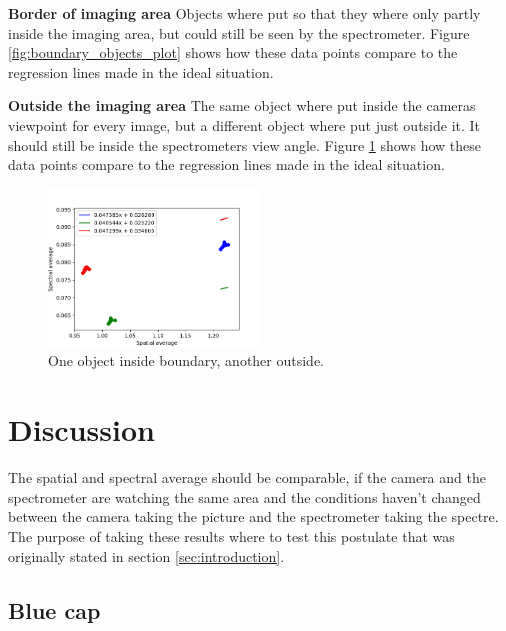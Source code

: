 \textbf{Border of imaging area}
Objects where put so that they where only partly inside the imaging area, but could still be seen by the spectrometer. Figure \ref{fig:boundary_objects_plot} shows how these data points compare to the regression lines made in the ideal situation.

\textbf{Outside the imaging area}
The same object where put inside the cameras viewpoint for every image, but a different object where put just outside it. It should still be inside the spectrometers view angle. Figure \ref{fig:outside_objects_plot} shows how these data points compare to the regression lines made in the ideal situation.

\begin{figure}[H]
    \centering
    \includegraphics[width=0.5\textwidth]{Plots/spectral_vs_spatial_average_with_regression_outside_objects.png}
    \caption{One object inside boundary, another outside.}
    \label{fig:outside_objects_plot}
\end{figure}


\section{Discussion}
The spatial and spectral average should be comparable, if the camera and the spectrometer are watching the same area and the conditions haven't changed between the camera taking the picture and the spectrometer taking the spectre. The purpose of taking these results where to test this postulate that was originally stated in section \ref{sec:introduction}.

\subsection{Blue cap}
\label{sec:blue_cap_discussion}

